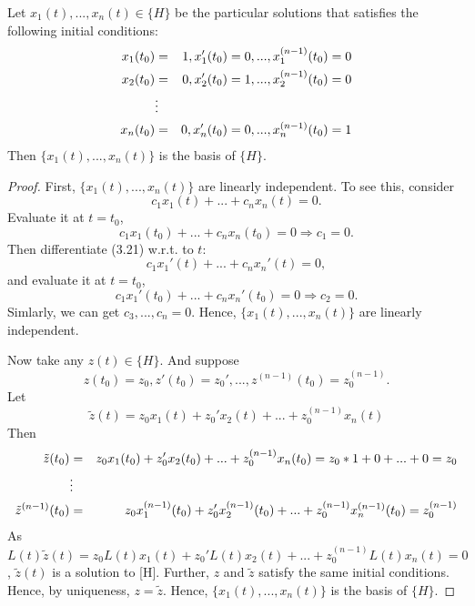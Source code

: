 \documentclass[twoside]{article}
\begin{document}
\begin{theorem}
    Let $x_1(t),...,x_n(t) \in \{H\}$ be the particular solutions that satisfies the following initial conditions:
    \begin{eqnarray}
        x_1(t_0)&=&1, x_1'(t_0)=0, ..., x_1^{(n-1)}(t_0)=0\\
        x_2(t_0)&=&0, x_2'(t_0)=1, ..., x_2^{(n-1)}(t_0)=0\\
        &\vdots& \notag\\
        x_n(t_0)&=&0, x_n'(t_0)=0, ..., x_n^{(n-1)}(t_0)=1
    \end{eqnarray}
    Then $\{x_1(t),...,x_n(t) \}$ is the basis of $\{H\}$.
\end{theorem}
\begin{proof}
    First, $\{x_1(t),...,x_n(t) \}$ are linearly independent. To see this, consider
    \begin{equation}
        c_1 x_1(t)+...+c_n x_n(t) = 0.
    \end{equation}
    Evaluate it at $t = t_0$,
    \begin{equation}
        c_1 x_1(t_0)+...+c_n x_n(t_0) = 0 \Longrightarrow c_1 = 0.
    \end{equation}
    Then differentiate (3.21) w.r.t. to $t$:
    \begin{equation}
        c_1 x_1'(t)+...+c_n x_n'(t) = 0,
    \end{equation}
    and evaluate it at $t = t_0$,
    \begin{equation}
        c_1 x_1'(t_0)+...+c_n x_n'(t_0) = 0 \Longrightarrow c_2 = 0.
    \end{equation}
    Simlarly, we can get $c_3, ..., c_n = 0$. Hence, $\{x_1(t),...,x_n(t) \}$ are linearly independent.

    Now take any $z(t) \in \{H\}$. And suppose 
    $$z(t_0) = z_0, z'(t_0)=z_0', ..., z^{(n-1)}(t_0)=z_0^{(n-1)}.$$
    Let
    \begin{equation}
        \tilde{z}(t) = z_0 x_1(t) + z_0' x_2(t) + ... + z_0^{(n-1)}x_n(t)
    \end{equation}
    Then
    \begin{eqnarray}
        \tilde{z}(t_0)&=& z_0 x_1(t_0) + z_0' x_2(t_0) + ... + z_0^{(n-1)}x_n(t_0) = z_0 * 1 + 0 + ... + 0 = z_0\\
        &\vdots& \notag\\
        \tilde{z}^{(n-1)}(t_0)&=& z_0 x^{(n-1)}_1(t_0) + z_0' x^{(n-1)}_2(t_0) + ... + z_0^{(n-1)}x^{(n-1)}_n(t_0) = {z}^{(n-1)}_0
    \end{eqnarray}
    As $L(t)\tilde{z}(t) = z_0 L(t) x_1(t) + z_0' L(t) x_2(t) + ... + z_0^{(n-1)}L(t) x_n(t) = 0$, $\tilde{z}(t)$ is a solution to [H]. Further, $z$ and $\tilde{z}$ satisfy the same initial conditions. Hence, by uniqueness, $z = \tilde{z}$. Hence, $\{x_1(t),...,x_n(t) \}$ is the basis of $\{H\}$.
\end{proof}
\end{document}
